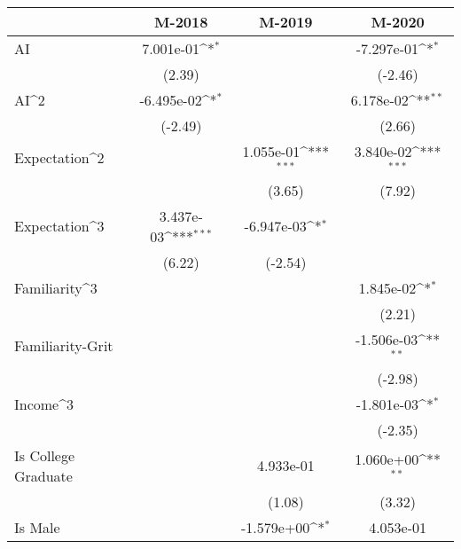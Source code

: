 {
\def\sym#1{\ifmmode^{#1}\else\(^{#1}\)\fi}
\begin{tabular}{l*{3}{c}}
\toprule
                         &      M-2018         &      M-2019         &      M-2020         \\
\midrule
AI                       &   7.001e-01\sym{*}  &                     &  -7.297e-01\sym{*}  \\
                         &      (2.39)         &                     &     (-2.46)         \\
\addlinespace
AI^2                     &  -6.495e-02\sym{*}  &                     &   6.178e-02\sym{**} \\
                         &     (-2.49)         &                     &      (2.66)         \\
\addlinespace
Expectation^2            &                     &   1.055e-01\sym{***}&   3.840e-02\sym{***}\\
                         &                     &      (3.65)         &      (7.92)         \\
\addlinespace
Expectation^3            &   3.437e-03\sym{***}&  -6.947e-03\sym{*}  &                     \\
                         &      (6.22)         &     (-2.54)         &                     \\
\addlinespace
Familiarity^3            &                     &                     &   1.845e-02\sym{*}  \\
                         &                     &                     &      (2.21)         \\
\addlinespace
Familiarity-Grit         &                     &                     &  -1.506e-03\sym{**} \\
                         &                     &                     &     (-2.98)         \\
\addlinespace
Income^3                 &                     &                     &  -1.801e-03\sym{*}  \\
                         &                     &                     &     (-2.35)         \\
\addlinespace
Is College Graduate      &                     &   4.933e-01         &   1.060e+00\sym{**} \\
                         &                     &      (1.08)         &      (3.32)         \\
\addlinespace
Is Male                  &                     &  -1.579e+00\sym{*}  &   4.053e-01         \\

\end{tabular}}
